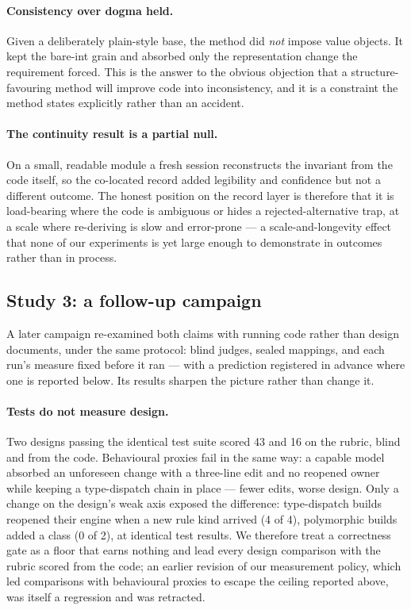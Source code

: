 \documentclass[11pt]{article}
\begin{document}
\paragraph{Consistency over dogma held.} Given a deliberately plain-style base, the method did \emph{not} impose value objects. It kept the bare-int grain and absorbed only the representation change the requirement forced. This is the answer to the obvious objection that a structure-favouring method will improve code into inconsistency, and it is a constraint the method states explicitly rather than an accident.

\paragraph{The continuity result is a partial null.} On a small, readable module a fresh session reconstructs the invariant from the code itself, so the co-located record added legibility and confidence but not a different outcome. The honest position on the record layer is therefore that it is load-bearing where the code is ambiguous or hides a rejected-alternative trap, at a scale where re-deriving is slow and error-prone --- a scale-and-longevity effect that none of our experiments is yet large enough to demonstrate in outcomes rather than in process.


\subsection{Study 3: a follow-up campaign}
\label{sec:study3}

A later campaign re-examined both claims with running code rather than design documents, under the same protocol: blind judges, sealed mappings, and each run's measure fixed before it ran --- with a prediction registered in advance where one is reported below. Its results sharpen the picture rather than change it.

\paragraph{Tests do not measure design.} Two designs passing the identical test suite scored 43 and 16 on the rubric, blind and from the code. Behavioural proxies fail in the same way: a capable model absorbed an unforeseen change with a three-line edit and no reopened owner while keeping a type-dispatch chain in place --- fewer edits, worse design. Only a change on the design's weak axis exposed the difference: type-dispatch builds reopened their engine when a new rule kind arrived (4 of 4), polymorphic builds added a class (0 of 2), at identical test results. We therefore treat a correctness gate as a floor that earns nothing and lead every design comparison with the rubric scored from the code; an earlier revision of our measurement policy, which led comparisons with behavioural proxies to escape the ceiling reported above, was itself a regression and was retracted.
\end{document}

